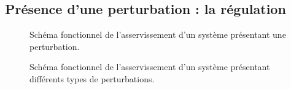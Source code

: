 \subsection{Présence d'une perturbation : la régulation}
\begin{figure}[!h]
    \centering
    
    \caption{Schéma fonctionnel de l'asservissement d'un système 
             présentant une perturbation.\label{fig-pert}}
\end{figure}
\begin{figure}[!h]
    \centering
    
    \caption{Schéma fonctionnel de l'asservissement d'un système 
             présentant différents types de perturbations. \label{fig-pert2}}
\end{figure}
